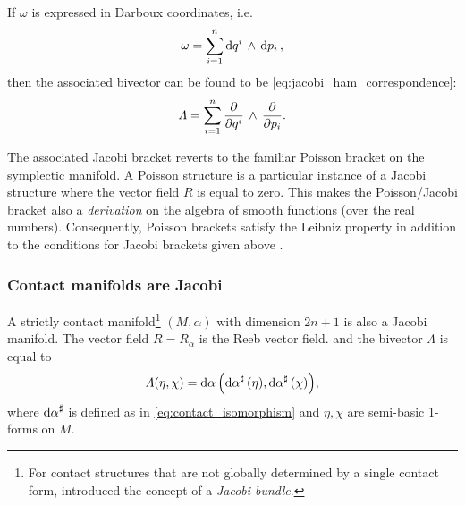 If \(\omega\) is expressed in Darboux coordinates, i.e.
\begin{equation}
     \omega = \sum^n_{i = 1}  \dd{q^i}\,\wedge\,\dd{p_i} ,
\end{equation}
then the associated bivector can be found to be \cref{eq:jacobi_ham_correspondence}:
\begin{equation}
     \Lambda = \sum^n_{i = 1}  \pdv{}{q^i}\,\wedge\,\pdv{}{p_i} .
\end{equation}

The associated Jacobi bracket reverts to the familiar Poisson bracket on the symplectic manifold. A Poisson structure is a particular instance of a Jacobi structure where the vector field \(R\) is equal to zero. This makes the Poisson/Jacobi bracket also a \emph{derivation} on the algebra of smooth functions (over the real numbers). Consequently, Poisson brackets satisfy the Leibniz property in addition to the conditions for Jacobi brackets given above \cite{marle1991}.

\subsubsection{Contact manifolds are Jacobi}
A strictly contact manifold\footnote{For contact structures that are not globally determined by a single contact form, \citet{marle1991} introduced the concept of a \emph{Jacobi bundle}.} \((M, \alpha)\) with dimension \(2n + 1\) is also a Jacobi manifold. The vector field \(R = R_\alpha\) is the Reeb vector field. 
and the bivector \(\Lambda\) is equal to
\begin{equation}
     \Lambda(\eta, \chi) = \dd{\alpha}\qty(\dd{\alpha}^\sharp(\eta), \dd{\alpha}^\sharp(\chi)),
\end{equation}
where \(\dd{\alpha}^\sharp\) is defined as in \cref{eq:contact_isomorphism} and \(\eta,\chi\) are semi-basic 1-forms on \(M\).

